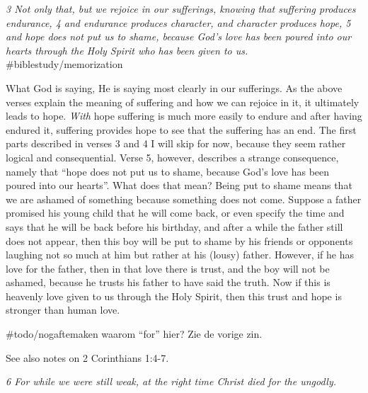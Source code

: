 \emph{3 Not only that, but we rejoice in our sufferings, knowing that
suffering produces endurance, 4 and endurance produces character, and
character produces hope, 5 and hope does not put us to shame, because
God's love has been poured into our hearts through the Holy Spirit who
has been given to us.} \#biblestudy/memorization

What God is saying, He is saying most clearly in our sufferings. As the
above verses explain the meaning of suffering and how we can rejoice in
it, it ultimately leads to hope. \emph{With} hope suffering is much more
easily to endure and after having endured it, suffering provides hope to
see that the suffering has an end. The first parts described in verses 3
and 4 I will skip for now, because they seem rather logical and
consequential. Verse 5, however, describes a strange consequence, namely
that ``hope does not put us to shame, because God's love has been poured
into our hearts''. What does that mean? Being put to shame means that we
are ashamed of something because something does not come. Suppose a
father promised his young child that he will come back, or even specify
the time and says that he will be back before his birthday, and after a
while the father still does not appear, then this boy will be put to
shame by his friends or opponents laughing not so much at him but rather
at his (lousy) father. However, if he has love for the father, then in
that love there is trust, and the boy will not be ashamed, because he
trusts his father to have said the truth. Now if this is heavenly love
given to us through the Holy Spirit, then this trust and hope is
stronger than human love.

\#todo/nogaftemaken waarom ``for'' hier? Zie de vorige zin.

See also notes on 2 Corinthians 1:4-7.

\emph{6 For while we were still weak, at the right time Christ died for
the ungodly.}

